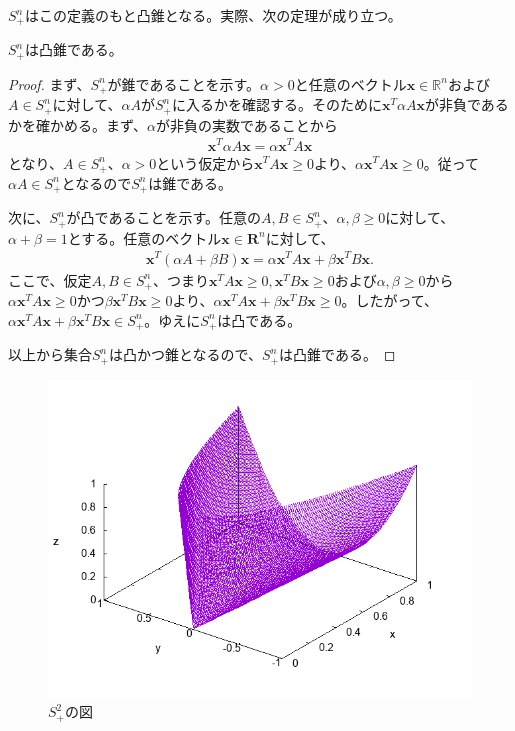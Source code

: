 $S_+^n$はこの定義のもと凸錐となる。実際、次の定理が成り立つ。
\begin{theorem}
  $S_+^n$は凸錐である。
\end{theorem}
\begin{proof}
  まず、$S_+^n$が錐であることを示す。$\alpha > 0$と任意のベクトル$\mathbf{x} \in \mathbb{R}^n$および$A \in S_+^n$に対して、$\alpha A$が$S_+^n$に入るかを確認する。そのために$\mathbf{x}^T \alpha A \mathbf{x}$が非負であるかを確かめる。まず、$\alpha$が非負の実数であることから
  \begin{align*}
    \mathbf{x}^T \alpha A \mathbf{x} = \alpha \mathbf{x}^T A \mathbf{x}
  \end{align*}
  となり、$A \in S_+^n$、$\alpha > 0$という仮定から$\mathbf{x}^T A \mathbf{x} \geq 0$より、$\alpha \mathbf{x}^T A \mathbf{x} \geq 0$。従って$\alpha A \in S_+^n$となるので$S_+^n$は錐である。

  次に、$S_+^n$が凸であることを示す。任意の$A, B \in S_+^n$、$\alpha, \beta \geq 0$に対して、$\alpha + \beta = 1$とする。任意のベクトル$\mathbf{x} \in \mathbf{R}^n$に対して、
  \begin{align*}
    \mathbf{x}^T \left(\alpha A + \beta B\right) \mathbf{x} = \alpha \mathbf{x}^T A \mathbf{x} + \beta \mathbf{x}^T B \mathbf{x}.
  \end{align*}
  ここで、仮定$A, B \in S_+^n$、つまり$\mathbf{x}^T A \mathbf{x} \geq 0, \mathbf{x}^T B \mathbf{x} \geq 0$および$\alpha, \beta \geq 0$から$\alpha \mathbf{x}^T A \mathbf{x} \geq 0$かつ$\beta \mathbf{x}^T B \mathbf{x} \geq 0$より、$\alpha \mathbf{x}^T A \mathbf{x} + \beta \mathbf{x}^T B \mathbf{x} \geq 0$。したがって、$\alpha \mathbf{x}^T A \mathbf{x} + \beta \mathbf{x}^T B \mathbf{x} \in S_+^n$。ゆえに$S_+^n$は凸である。

  以上から集合$S_+^n$は凸かつ錐となるので、$S_+^n$は凸錐である。
\end{proof}
\begin{figure}
  \includegraphics{PSDcone.png}
  \caption[]{$S_+^2$の図}
\end{figure}

